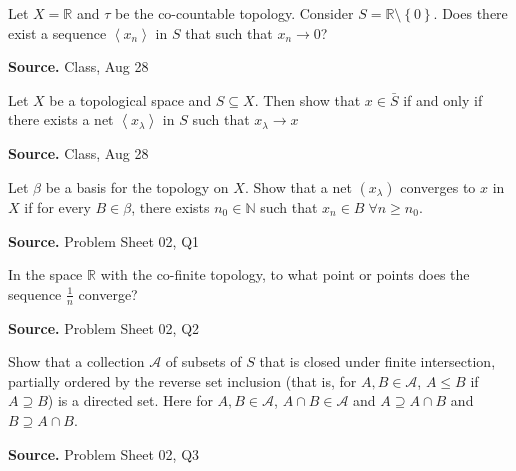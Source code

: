 \documentclass[12pt,twoside]{report}
\newenvironment*{source}{\hfill\scriptsize\textbf{Source.}\space}{\par}
\begin{document}
\begin{samepage}
\begin{ex}
Let $X = \mathbb{R}$ and $\tau$ be the co-countable topology. Consider $S = \mathbb{R} \setminus \left\{ 0 \right\}$.
Does there exist a sequence $\left\langle  x_n \right\rangle $ in $S$ that such that $x_n \to 0$?
\end{ex}
\begin{source}
Class, Aug 28
\end{source}
\end{samepage}

\begin{samepage}
\begin{ex}
Let $X$ be a topological space and $S \subseteq X$. Then show that $x \in \bar{S}$ if and only if there exists a net $\left\langle  x_\lambda \right\rangle $ in $S$ such that $ x_\lambda \to x$
\end{ex}
\begin{source}
Class, Aug 28
\end{source}
\end{samepage}

\begin{samepage}
\begin{ex}
    Let $\beta$ be a basis for the topology on $X$. Show that a net $\left (x_\lambda\right )$ converges to $x$ in $X$ if for every $B \in \beta$, there exists $n_0 \in \mathbb{N}$ such that $x_n \in B \;\forall n \geq n_0$.
\end{ex}
\begin{source}
Problem Sheet 02, Q1
\end{source}
\end{samepage}

\begin{samepage}
\begin{ex}
In the space $\mathbb{R}$ with the co-finite topology, to what point or points does the sequence $\frac{1}{n}$ converge?
\end{ex}
\begin{source}
Problem Sheet 02, Q2
\end{source}
\end{samepage}

\begin{samepage}
\begin{ex}
Show that a collection $\mathcal{A}$ of subsets of $S$ that is closed under finite intersection, partially ordered by the reverse set inclusion (that is, for $A, B \in \mathcal{A}$, $A \leq B$ if $A \supseteq B$) is a directed set. Here for $A,B \in \mathcal{A}$, $A \cap B \in \mathcal{A}$ and $A \supseteq A \cap B$ and $B \supseteq A \cap B$.
\end{ex}
\begin{source}
Problem Sheet 02, Q3
\end{source}
\end{samepage}
\end{document}
